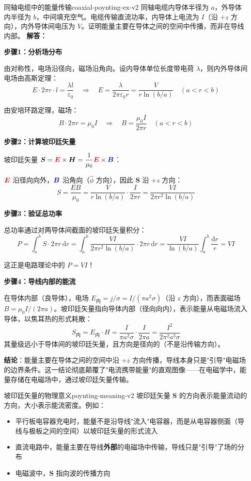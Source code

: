 \documentclass[11pt,a4paper,openany,oneside]{book}
\newcommand{\diff}{\mathrm{d}}
\newcommand{\vecE}{\textcolor{red}{\vect{E}}}
\newcommand{\vecB}{\textcolor{blue}{\vect{B}}}
\newcommand{\eps}{\varepsilon}
\newcommand{\muz}{\mu_0}
\newcommand{\vect}[1]{\bm{#1}}
\newcommand{\difficulty}[1]{\marginnote{\textcolor{red}{\textbf{[#1]}}}}
\begin{document}
\begin{example}{同轴电缆中的能量传输}{coaxial-poynting-ex-v2}
\difficulty{提高}
同轴电缆内导体半径为 $a$，外导体内半径为 $b$，中间填充空气。电缆传输直流功率，内导体上电流为 $I$（沿 $+z$ 方向），内外导体间电压为 $V$。证明能量主要在导体之间的空间中传播，而非在导线内部。
\tcblower
\textbf{解答：}

\textbf{步骤1：分析场分布}

由对称性，电场沿径向，磁场沿角向。设内导体单位长度带电荷 $\lambda$，则内外导体间电场由高斯定理：
\[
E \cdot 2\pi r \cdot l = \frac{\lambda l}{\eps_0} \quad\Rightarrow\quad E = \frac{\lambda}{2\pi\eps_0 r} = \frac{V}{r\ln(b/a)} \quad (a < r < b)
\]

由安培环路定理，磁场：
\[
B \cdot 2\pi r = \muz I \quad\Rightarrow\quad B = \frac{\muz I}{2\pi r} \quad (a < r < b)
\]

\textbf{步骤2：计算坡印廷矢量}

坡印廷矢量 $\vect{S} = \vecE \times \vect{H} = \dfrac{1}{\muz}\vecE \times \vecB$：

$\vecE$ 沿径向向外，$\vecB$ 沿角向（$\hat{\phi}$ 方向），因此 $\vect{S}$ 沿 $+z$ 方向：
\[
S = \frac{EB}{\muz} = \frac{V}{r\ln(b/a)} \cdot \frac{I}{2\pi r} = \frac{VI}{2\pi r^2\ln(b/a)}
\]

\textbf{步骤3：验证总功率}

总功率通过对两导体间截面的坡印廷矢量积分：
\[
P = \int_a^b S \cdot 2\pi r\,\diff r = \int_a^b \frac{VI}{2\pi r^2\ln(b/a)} \cdot 2\pi r\,\diff r = \frac{VI}{\ln(b/a)} \int_a^b \frac{\diff r}{r} = VI
\]

这正是电路理论中的 $P = VI$！

\textbf{步骤4：导线内部的能流}

在导体内部（良导体），电场 $E_{\text{内}} = j/\sigma = I/(\pi a^2\sigma)$（沿 $z$ 方向），而表面磁场 $B = \muz I/(2\pi a)$。坡印廷矢量指向导体内部（径向向内），表示能量从电磁场流入导体，以焦耳热的形式耗散：
\[
S_{\text{内}} = E_{\text{内}} \cdot H = \frac{I}{\pi a^2\sigma} \cdot \frac{I}{2\pi a} = \frac{I^2}{2\pi^2 a^3\sigma}
\]
其量级远小于导体间的坡印廷矢量，且方向是径向的（不是沿传输方向）。

\textbf{结论}：能量主要在导体之间的空间中沿 $+z$ 方向传播，导线本身只是"引导"电磁场的边界条件。这一结论彻底颠覆了"电流携带能量"的直观图像——在电磁学中，能量存储在电磁场中，通过坡印廷矢量传输。
\end{example}

\begin{insight}{坡印廷矢量的物理意义}{poynting-meaning-v2}
坡印廷矢量 $\vect{S}$ 的方向表示能量流动的方向，大小表示能流密度。例如：
\begin{itemize}
\item 平行板电容器充电时，能量不是沿导线"流入"电容器，而是从电容器侧面（导线与极板之间的空间）以坡印廷矢量的形式流入
\item 直流电路中，能量主要在导线\textbf{外部}的电磁场中传输，导线只是"引导"了场的分布
\item 电磁波中，$\vect{S}$ 指向波的传播方向
\end{itemize}
\end{insight}
\end{document}
